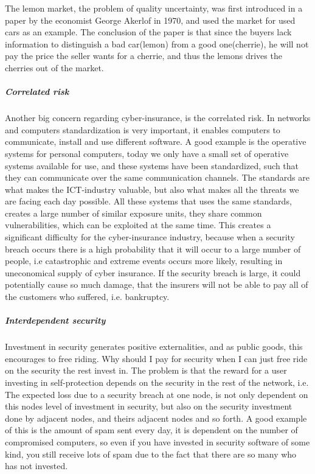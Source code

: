       The lemon market, the problem of quality uncertainty, was first introduced in a paper \cite{lemonpaper} by the economist George Akerlof in 1970,
       and used the market for used cars as an example.\cite{lemon} The conclusion of the paper is
        that since the buyers lack information to distinguish a bad car(lemon) from a good
         one(cherrie), he will not pay the price the seller wants for a cherrie,
          and thus the lemons drives the cherries out of the market. 
\subparagraph{Correlated risk}
Another big concern regarding cyber-insurance, is the correlated risk. In networks and computers
 standardization is very important, it enables computers to communicate, 
 install and use different software. A good example is the operative systems for personal computers,
  today we only have a small set of operative systems available for use, and these systems have been
   standardized, such that they can communicate over the same communication channels. The standards are what makes the ICT-industry valuable, 
   but also what makes all the threats we are facing each day possible. 
   All these systems that uses the same standards, creates a large number of similar exposure units,
    they share common vulnerabilities, which can be exploited at the same time. 
This creates a significant difficulty for the cyber-insurance industry, because
when a security breach occurs there is a high probability that it will occur to a large number of people, i.e catastrophic and extreme events occurs more likely, resulting in uneconomical supply of cyber insurance.
If the security breach is large, it could potentially cause so much damage, that the insurers will not be able to pay all of the customers who suffered, i.e. bankruptcy.\cite{bohme2010modeling} 
\subparagraph{Interdependent security}
Investment in security generates positive externalities, and as public goods, this encourages to free riding. Why should I pay for security when I can just free ride on the security the rest invest in.  The problem is that the reward for a user investing in self-protection depends on the security in the rest of the network, i.e. The expected loss due to a security breach at one node, is not only
dependent on this nodes level of investment in security, but also on the security investment done
  by adjacent nodes, and theirs adjacent nodes and so forth. 
  A good example of this is the amount of spam sent every day, it is dependent on the number of compromised computers, so even if you have invested in security software of some kind, you still receive lots of spam due to the fact that there are so many who has not invested. 
  \cite{towardsInsurable}

